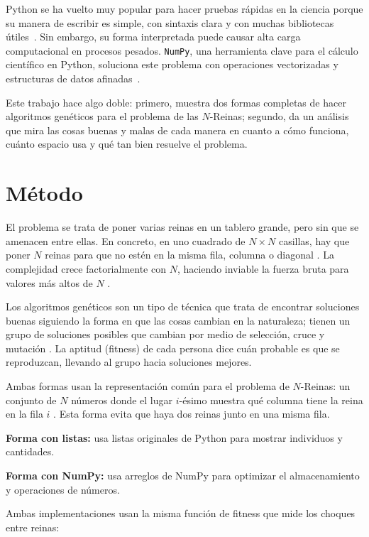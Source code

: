 \documentclass[journal]{IEEEtran}
\begin{document}
Python se ha vuelto muy popular para hacer pruebas rápidas en la ciencia porque su manera de escribir es simple, con sintaxis clara y con muchas bibliotecas útiles~\cite{hunter2007}. Sin embargo, su forma interpretada puede causar alta carga computacional en procesos pesados. \texttt{NumPy}, una herramienta clave para el cálculo científico en Python, soluciona este problema con operaciones vectorizadas y estructuras de datos afinadas~\cite{harris2020}.  

Este trabajo hace algo doble: primero, muestra dos formas completas de hacer algoritmos genéticos para el problema de las $N$-Reinas; segundo, da un análisis que mira las cosas buenas y malas de cada manera en cuanto a cómo funciona, cuánto espacio usa y qué tan bien resuelve el problema.



\section{Método} \label{sec:método}
El problema se trata de poner varias reinas en un tablero grande, pero sin que se amenacen entre ellas. En concreto, en uno cuadrado de $N \times N$ casillas, hay que poner $N$ reinas para que no estén en la misma fila, columna o diagonal \cite{dijkstra1959note}.  
La complejidad crece factorialmente con $N$, haciendo inviable la fuerza bruta para valores más altos de $N$ \cite{moon1999genetic}.  

Los algoritmos genéticos son un tipo de técnica que trata de encontrar soluciones buenas siguiendo la forma en que las cosas cambian en la naturaleza; tienen un grupo de soluciones posibles que cambian por medio de selección, cruce y mutación \cite{goldberg1989genetic}. La aptitud (fitness) de cada persona dice cuán probable es que se reproduzcan, llevando al grupo hacia soluciones mejores.  

Ambas formas usan la representación común para el problema de $N$-Reinas: un conjunto de $N$ números donde el lugar $i$-ésimo muestra qué columna tiene la reina en la fila $i$ \cite{takefuji1991artificial}. Esta forma evita que haya dos reinas junto en una misma fila.  

\textbf{Forma con listas:} usa listas originales de Python para mostrar individuos y cantidades. 

\textbf{Forma con NumPy:} usa arreglos de NumPy para optimizar el almacenamiento y operaciones de números.  


Ambas implementaciones usan la misma función de fitness que mide los choques entre reinas:
\end{document}
